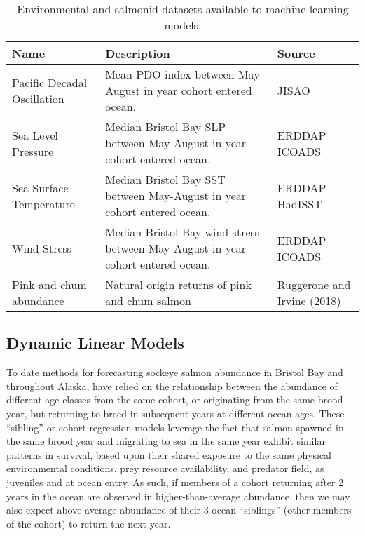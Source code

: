 \documentclass[
]{article}
\begin{document}
\begin{table}

\caption{\label{tab:dat}Environmental and salmonid datasets available to machine learning models.}
\centering
\begin{tabu} to 
\toprule
Name & Description & Source\\
\midrule
Pacific Decadal Oscillation & Mean PDO index between May-August in year cohort entered ocean. & JISAO\\
Sea Level Pressure & Median Bristol Bay SLP between May-August in year cohort entered ocean. & ERDDAP ICOADS\\
Sea Surface Temperature & Median Bristol Bay SST between May-August in year cohort entered ocean. & ERDDAP HadISST\\
Wind Stress & Median Bristol Bay wind stress between May-August in year cohort entered ocean. & ERDDAP ICOADS\\
Pink and chum abundance & Natural origin returns of pink and chum salmon & Ruggerone and Irvine (2018)\\
\bottomrule
\end{tabu}
\end{table}

\hypertarget{dynamic-linear-models}{%
\subsection*{Dynamic Linear Models}\label{dynamic-linear-models}}

To date methods for forecasting sockeye salmon abundance in Bristol Bay and throughout Alaska, have relied on the relationship between the abundance of different age classes from the same cohort, or originating from the same brood year, but returning to breed in subsequent years at different ocean ages. These ``sibling'' or cohort regression models leverage the fact that salmon spawned in the same brood year and migrating to sea in the same year exhibit similar patterns in survival, based upon their shared exposure to the same physical environmental conditions, prey resource availability, and predator field, as juveniles and at ocean entry. As such, if members of a cohort returning after 2 years in the ocean are observed in higher-than-average abundance, then we may also expect above-average abundance of their 3-ocean ``siblings'' (other members of the cohort) to return the next year.
\end{document}

